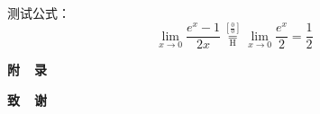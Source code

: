 \documentclass[zihao = -4,cn]{oucart}
\begin{document}
测试公式：
\begin{equation}
 \lim_{x\to 0}{\frac{e^x-1}{2x}}
 \overset{\left[\frac{0}{0}\right]}{\underset{\mathrm{H}}{=}}
 \lim_{x\to 0}{\frac{e^x}{2}}={\frac{1}{2}}
\end{equation}
\newpage

%


\newpage


\begin{center}
 \textbf{附\ \ 录} \\
\end{center}


\newpage
\begin{center}
	 \textbf{致\ \ 谢} \\
\end{center}
\end{document}
